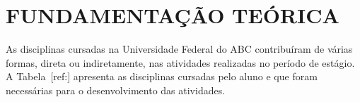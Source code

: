 \documentclass[
  12pt,				%
  openany,
  oneside,
  a4paper,			%
  english,			%
  brazil
]{article}
\numberwithin{figure}{section}
\numberwithin{table}{section}
\begin{document}





\section{FUNDAMENTAÇÃO TEÓRICA}



As disciplinas cursadas na Universidade Federal do ABC contribuíram de várias formas, direta ou indiretamente, nas atividades realizadas no período de estágio. A Tabela~[ref:] apresenta as disciplinas cursadas pelo aluno e que foram necessárias para o desenvolvimento das atividades.

%  
%  
%  
%  
%  
%  
%  
%  
%  
%  
%  
%  
\end{document}
